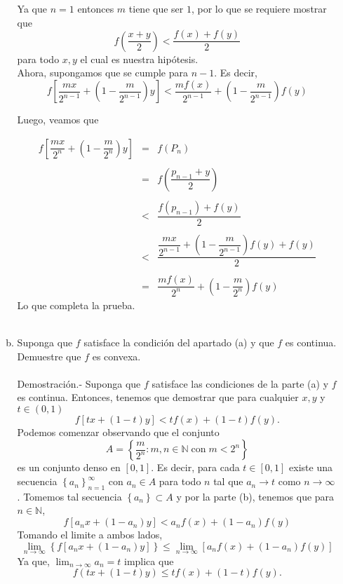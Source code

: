 \begin{enumerate}[\bfseries 1.]
\begin{enumerate}[(a)]
		Ya que $n=1$ entonces $m$ tiene que ser $1$, por lo que se requiere mostrar que 
		$$f\left(\dfrac{x+y}{2}\right)<\dfrac{f(x)+f(y)}{2}$$
		para todo $x,y$ el cual es nuestra hipótesis.\\


		Ahora, supongamos que se cumple para $n-1$. Es decir,
		$$f\left[\dfrac{mx}{2^{n-1}}+\left(1-\dfrac{m}{2^{n-1}}\right)y\right]<\dfrac{mf(x)}{2^{n-1}}+\left(1-\dfrac{m}{2^{n-1}}\right)f(y)$$

		Luego, veamos que

		$$
		\begin{array}{rcl}
		    f\left[\dfrac{mx}{2^n}+\left(1-\dfrac{m}{2^n}\right)y\right] &=& f(P_n)\\\\
		    &=& f\left(\dfrac{p_{n-1}+y}{2}\right)\\\\
		    &<&\dfrac{f(p_{n-1})+f(y)}{2}\\\\
		    &<&\dfrac{\dfrac{mx}{2^{n-1}}+\left(1-\dfrac{m}{2^{n-1}}\right)f(y)+f(y)}{2}\\\\
		    &=& \dfrac{mf(x)}{2^n}+\left(1-\dfrac{m}{2^n}\right)f(y)
		\end{array}
		$$
		Lo que completa la prueba.\\\\


	    \item Suponga que $f$ satisface la condición del apartado (a) y que $f$ es continua. Demuestre que $f$ es convexa.\\\\
		Demostración.-\; Suponga que $f$ satisface las condiciones de la parte (a) y $f$ es continua. Entonces, tenemos que demostrar que para cualquier $x,y$ y $t\in (0,1)$
		$$f\left[tx+(1-t)y\right]<tf(x)+(1-t)f(y).$$
		Podemos comenzar observando que el conjunto 
		$$A=\left\{\dfrac{m}{2^n}:m,n\in \mathbb{N}\; \mbox{con}\; m<2^n\right\}$$
		es un conjunto denso en $[0,1]$. Es decir, para cada $t\in [0,1]$ existe una secuencia $\left\{a_n\right\}_{n=1}^\infty$ con $a_n \in A$ para todo $n$ tal que $a_n\to t$ como $n\to \infty$. Tomemos tal secuencia $\left\{a_n\right\}\subset A$ y por la parte (b), tenemos que para $n\in \mathbb{N}$,
		$$f\left[a_n x + (1-a_n)y\right]<a_nf(x)+(1-a_n)f(y)$$
		Tomando el limite a ambos lados,
		$$\lim_{n\to \infty}\left\{f\left[a_n x + (1-a_n)y\right]\right\}\leq \lim_{n\to \infty}\left[a_nf(x)+(1-a_n)f(y)\right]$$
		Ya que, $\lim_{n\to \infty}a_n=t$ implica que
		$$f(tx+(1-t)y)\leq tf(x)+(1-t)f(y).$$\\


\end{enumerate}
\end{enumerate}
